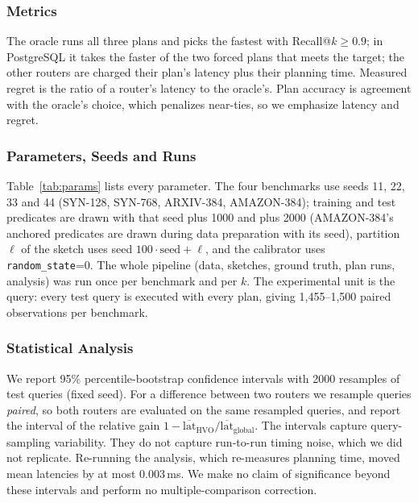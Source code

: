 \documentclass[sigconf,nonacm]{acmart}
\begin{document}
\subsubsection{Metrics}
The oracle runs all three plans and picks the fastest with Recall@$k\ge0.9$; in PostgreSQL it takes the faster of the two forced plans that meets the target; the other routers are charged their plan's latency plus their planning time. Measured regret is the ratio of a router's latency to the oracle's. Plan accuracy is agreement with the oracle's choice, which penalizes near-ties, so we emphasize latency and regret.

\subsubsection{Parameters, Seeds and Runs}
Table~\ref{tab:params} lists every parameter. The four benchmarks use seeds 11, 22, 33 and 44 (SYN-128, SYN-768, ARXIV-384, AMAZON-384); training and test predicates are drawn with that seed plus 1000 and plus 2000 (AMAZON-384's anchored predicates are drawn during data preparation with its seed), partition $\ell$ of the sketch uses seed $100\cdot\text{seed}+\ell$, and the calibrator uses \texttt{random\_state}=0. The whole pipeline (data, sketches, ground truth, plan runs, analysis) was run once per benchmark and per $k$. The experimental unit is the query: every test query is executed with every plan, giving 1{,}455--1{,}500 paired observations per benchmark.

\subsubsection{Statistical Analysis}
We report 95\% percentile-bootstrap confidence intervals with 2000 resamples of test queries (fixed seed). For a difference between two routers we resample queries \emph{paired}, so both routers are evaluated on the same resampled queries, and report the interval of the relative gain $1-\overline{\text{lat}}_{\text{HVO}}/\overline{\text{lat}}_{\text{global}}$. The intervals capture query-sampling variability. They do not capture run-to-run timing noise, which we did not replicate. Re-running the analysis, which re-measures planning time, moved mean latencies by at most 0.003\,ms. We make no claim of significance beyond these intervals and perform no multiple-comparison correction.
\end{document}
